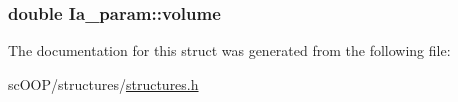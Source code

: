 \hypertarget{struct_ia__param_af19168047d88497117c70ff6672df1bf}{
\subsubsection[{volume}]{\setlength{\rightskip}{0pt plus 5cm}double Ia\+\_\+param\+::volume}}\label{struct_ia__param_af19168047d88497117c70ff6672df1bf}


The documentation for this struct was generated from the following file\+:\begin{DoxyCompactItemize}
\item 
sc\+O\+O\+P/structures/\hyperlink{structures_8h}{structures.\+h}\end{DoxyCompactItemize}
